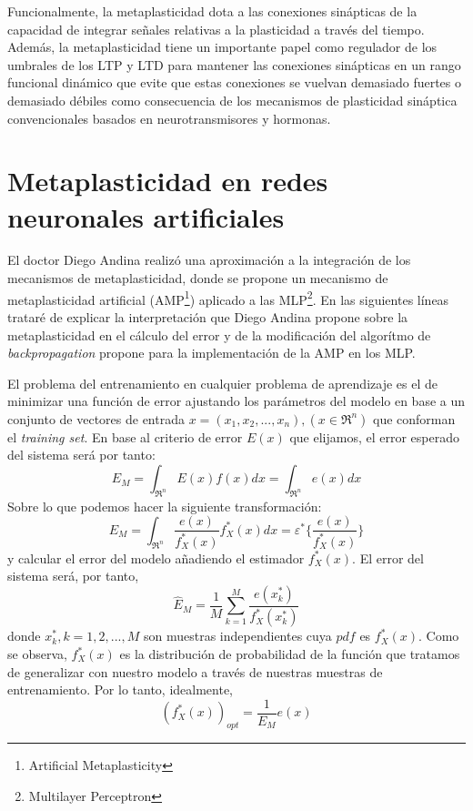 \documentclass[10pt,a4paper]{report}
\begin{document}
Funcionalmente, la metaplasticidad dota a las conexiones sinápticas de la capacidad de integrar señales relativas a la plasticidad a través del tiempo. Además, la metaplasticidad tiene un importante papel como regulador de los umbrales de los LTP y LTD para mantener las conexiones sinápticas en un rango funcional dinámico que evite que estas conexiones se vuelvan demasiado fuertes o demasiado débiles como consecuencia de los mecanismos de plasticidad sináptica convencionales basados en neurotransmisores y hormonas.

\section{Metaplasticidad en redes neuronales artificiales}
El doctor Diego Andina realizó una aproximación a la integración de los mecanismos de metaplasticidad\citep{Andina2009}, donde se propone un mecanismo de metaplasticidad artificial (AMP\footnote{Artificial Metaplasticity}) aplicado a las MLP\footnote{Multilayer Perceptron}. En las siguientes líneas trataré de explicar la interpretación que Diego Andina propone sobre la metaplasticidad en el cálculo del error y de la modificación del algorítmo de \textit{backpropagation} propone para la implementación de la AMP en los MLP.

El problema del entrenamiento en cualquier problema de aprendizaje es el de minimizar una función de error ajustando los parámetros del modelo en base a un conjunto de vectores de entrada $x=(x_1,x_2,...,x_n),(x\in\Re^n)$ que conforman el \textit{training set}. En base al criterio de error $E(x)$ que elijamos, el error esperado del sistema será por tanto:
\begin{equation}
	E_M = \int_{\Re^n}E(x)f(x)dx = \int_{\Re^n}e(x)dx
\end{equation} 
Sobre lo que podemos hacer la siguiente transformación:
\begin{equation}
	\label{metaSub1}
	E_M = \int_{\Re^n}\dfrac{e(x)}{f^*_X(x)}f^*_X(x)dx = \varepsilon^*\lbrace\dfrac{e(x)}{f^*_X(x)}\rbrace
\end{equation}
y calcular el error del modelo añadiendo el estimador $f^*_X(x)$. El error del sistema será, por tanto,
\begin{equation}
	\label{metaSub2}
	\widehat{E}_M=\dfrac{1}{M}\sum^M_{k=1}\dfrac{e(x^*_k)}{f^*_X(x^*_k)}
\end{equation}
donde $x^*_k,k=1,2,...,M$ son muestras independientes cuya $pdf$ es $f^*_X(x)$. Como se observa, $f^*_X(x)$ es la distribución de probabilidad de la función que tratamos de generalizar con nuestro modelo a través de nuestras muestras de entrenamiento. Por lo tanto, idealmente, 
\begin{equation}
	\label{metaSub3}
	(f^*_X(x))_{opt}=\dfrac{1}{E_M}e(x)
\end{equation}
\end{document}
